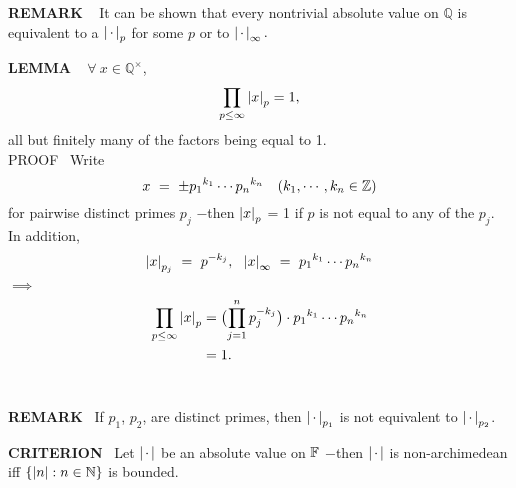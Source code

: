 \begin{x}{\small\bf REMARK} \ %
It can be shown that every nontrivial absolute value on $\mathbb{Q}$ is equivalent to a $\left\vert\hspace{0.05cm} \cdot \hspace{0.05cm}\right\vert_p$ for some $p$ or to $\left\vert\hspace{0.05cm} \cdot \hspace{0.05cm}\right\vert_{\infty}.$
\end{x}
\vspace{0.1cm}

\begin{x}{\small\bf LEMMA} \ %
$\forall  \ x \in \mathbb{Q}^\times$,
\[
\prod_{p \le \infty} \left\vert x\right\vert_p = 1,
\]
all but finitely many of the factors being equal to 1.\\

\quad PROOF \ Write
\[
x \ = \ \pm {p_1}^{k_1} \dotsb {p_n}^{k_n}		\quad (k_1, \dotsb , k_n \in \mathbb{Z})
\]
for pairwise distinct primes $p_j$ $-$then $\left\vert x\right\vert_p$ = 1 if $p$ is not equal to any of the $p_j$.  
In addition,
\[
\abs{x}_{p_j} \ = \ p^{-k_j},  \ \ \abs{x}_\infty \ = \ {p_1}^{k_1} \dotsb {p_n}^{k_n}	
\]
\indent\indent$\implies$
\[
\begin{aligned}
\prod_{p \le \infty} \left\vert x\right\vert_p 
&= \bigl(\prod_{j=1}^n p_j^{-k_j}\bigr ) \cdot {p_1}^{k_1} \dotsb {p_n}^{k_n}\\
& = 1.	
\end{aligned}
\]
\\
\end{x}
\vspace{0.1cm}

\begin{x}{\small\bf REMARK} \ 
If $p_1$,  $p_2$, are distinct primes, then $\left\vert\hspace{0.05cm} \cdot \hspace{0.05cm}\right\vert_{p_1}$ is not equivalent to  $\left\vert\hspace{0.05cm} \cdot \hspace{0.05cm}\right\vert_{p_2}$.\\

\]
\end{x}
\vspace{0.1cm}

\begin{x}{\small\bf CRITERION} \ 
Let $\left\vert\hspace{0.05cm} \cdot \hspace{0.05cm}\right\vert$ be an absolute value on $\mathbb{F}$ $-$then  $\left\vert\hspace{0.05cm} \cdot \hspace{0.05cm}\right\vert$ is non-archimedean iff $\{\left\vert n\right\vert: n \in \mathbb{N}\}$ is bounded.
\\
\vspace{0.25cm}
\]
\end{x}
